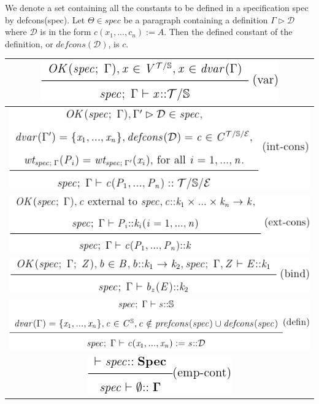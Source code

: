 \begin{defin} We denote a set containing all the constants to be defined in a
specification spec by defcons(spec). Let $\Theta \in spec$ be a paragraph
containing a definition $\Gamma \triangleright \mathcal{D}$ where $\mathcal{D}$
is in the form $c(x_{1},...,c_{n}):=A$. Then the defined constant of the
definition, or $defcons(\mathcal{D})$, is $c$.
\end{defin}

\begin{table}
    \begin{tabular}{|c|} \hline 
        \includegraphics[scale=0.6]{Figures/zcga/1.png} \\
        \hline
        \includegraphics[scale=0.6]{Figures/zcga/2.png} \\
        \hline
        \includegraphics[scale=0.6]{Figures/zcga/3.png} \\
        \hline
        \includegraphics[scale=0.6]{Figures/zcga/4.png} \\
        \hline
        \includegraphics[scale=0.6]{Figures/zcga/5.png} \\
        \hline
        \includegraphics[scale=0.6]{Figures/zcga/6.png} \\

\end{tabular}
\end{table}
